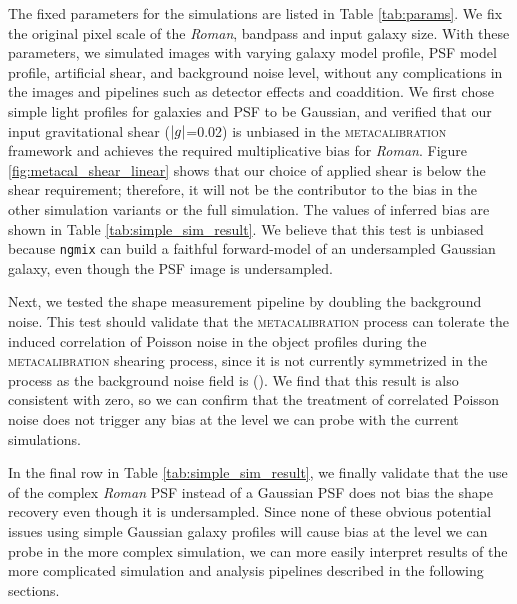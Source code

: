 \documentclass[fleqn,usenatbib]{mnras}
\begin{document}
The fixed parameters for the simulations are listed in Table \ref{tab:params}. We fix the original pixel scale of the \emph{Roman}, bandpass and input galaxy size. With these parameters, we simulated images with varying galaxy model profile, PSF model profile, artificial shear, and background noise level, without any complications in the images and pipelines such as detector effects and coaddition. We first chose simple light profiles for galaxies and PSF to be Gaussian, and verified that our input gravitational shear ($\abs{g}$=0.02) is unbiased in the \textsc{metacalibration} framework and achieves the required multiplicative bias for \emph{Roman}. Figure \ref{fig:metacal_shear_linear} shows that our choice of applied shear is below the shear requirement; therefore, it will not be the contributor to the bias in the other simulation variants or the full simulation. The values of inferred bias are shown in Table \ref{tab:simple_sim_result}. We believe that this test is unbiased because \texttt{ngmix} can build a faithful forward-model of an undersampled Gaussian galaxy, even though the PSF image is undersampled.

Next, we tested the shape measurement pipeline by doubling the background noise. This test should validate that the \textsc{metacalibration} process can tolerate the induced correlation of Poisson noise in the object profiles during the \textsc{metacalibration} shearing process, since it is not currently symmetrized in the process as the background noise field is (\citealt{2017ApJ...841...24S}). We find that this result is also consistent with zero, so we can confirm that the treatment of correlated Poisson noise does not trigger any bias at the level we can probe with the current simulations. 

In the final row in Table \ref{tab:simple_sim_result}, we finally validate that the use of the complex \emph{Roman} PSF instead of a Gaussian PSF does not bias the shape recovery even though it is undersampled. Since none of these obvious potential issues using simple Gaussian galaxy profiles will cause bias at the level we can probe in the more complex simulation, we can more easily interpret results of the more complicated simulation and analysis pipelines described in the following sections. 
\end{document}
